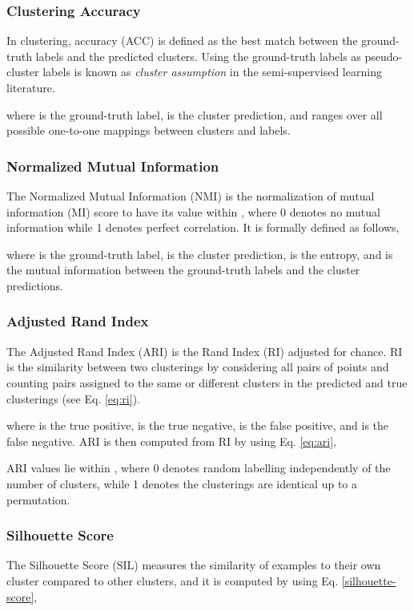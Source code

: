 \documentclass[conference]{IEEEtran}
\begin{document}
\subsubsection{Clustering Accuracy}
In clustering, accuracy (ACC) is defined as the best match between the ground-truth labels and the predicted clusters\cite{yang2010image}. Using the ground-truth labels as pseudo-cluster labels is known as \textit{cluster assumption} in the semi-supervised learning literature\cite{chapelle2009semisupervised}.


where  is the ground-truth label,  is the cluster prediction, and  ranges over all possible one-to-one mappings between clusters and labels.

\subsubsection{Normalized Mutual Information}
The Normalized Mutual Information (NMI) is the normalization of mutual information (MI) score to have its value within , where 0 denotes no mutual information while 1 denotes perfect correlation. It is formally defined as follows,

where  is the ground-truth label,  is the cluster prediction,  is the entropy, and  is the mutual information between the ground-truth labels and the cluster predictions.

\subsubsection{Adjusted Rand Index}
The Adjusted Rand Index (ARI)\cite{hubert1985comparing} is the Rand Index (RI) adjusted for chance. RI is the similarity between two clusterings by considering all pairs of points and counting pairs assigned to the same or different clusters in the predicted and true clusterings (see Eq. \ref{eq:ri}). 

where  is the true positive,  is the true negative,  is the false positive, and  is the false negative. ARI is then computed from RI by using Eq. \ref{eq:ari},

ARI values lie within , where 0 denotes random labelling independently of the number of clusters, while 1 denotes the clusterings are identical up to a permutation.

\subsubsection{Silhouette Score} The Silhouette Score (SIL)\cite{rousseeuw1987silhouettes} measures the similarity of examples to their own cluster compared to other clusters, and it is computed by using Eq. \ref{silhouette-score},
\end{document}
